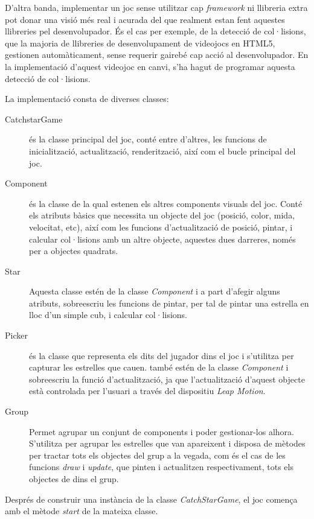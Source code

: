 \documentclass[12pt,a4paper,catalan]{article}
\begin{document}
	D'altra banda, implementar un joc sense utilitzar cap \textit{framework} ni llibreria extra pot donar una visió més real i acurada del que realment estan fent aquestes llibreries pel desenvolupador. És el cas per exemple, de la detecció de col·lisions, que la majoria de llibreries de desenvolupament de videojocs en HTML5, gestionen automàticament, sense requerir gairebé cap acció al desenvolupador. En la implementació d'aquest videojoc en canvi, s'ha hagut de programar aquesta detecció de col·lisions.
	
	La implementació consta de diverses classes:
	\begin{description}
		\item[CatchstarGame] és la classe principal del joc, conté entre d'altres, les funcions de inicialització, actualització, renderització, així com el bucle principal del joc.
		\item[Component] és la classe de la qual estenen els altres components visuals del joc. Conté els atributs bàsics que necessita un objecte del joc (posició, color, mida, velocitat, etc), així com les funcions d'actualització de posició, pintar, i calcular col·lisions amb un altre objecte, aquestes dues darreres, només per a objectes quadrats.
		\item[Star] Aquesta classe estén de la classe \textit{Component} i a part d'afegir alguns atributs, sobreescriu les funcions de pintar, per tal de pintar una estrella en lloc d'un simple cub, i calcular col·lisions.
		\item[Picker] és la classe que representa els dits del jugador dins el joc i s'utilitza per capturar les estrelles que cauen. també estén de la classe \textit{Component} i sobreescriu la funció d'actualització, ja que l'actualització d'aquest objecte està controlada per l'usuari a través del dispositiu \textit{Leap Motion}.
		\item[Group] Permet agrupar un conjunt de components i poder gestionar-los alhora. S'utilitza per agrupar les estrelles que van apareixent i disposa de mètodes per tractar tots els objectes del grup a la vegada, com és el cas de les funcions \textit{draw} i \textit{update}, que pinten i actualitzen respectivament, tots els objectes de dins el grup.
	\end{description}
	Després de construir una instància de la classe \textit{CatchStarGame}, el joc comença amb el mètode \textit{start} de la mateixa classe.
	
\end{document}
